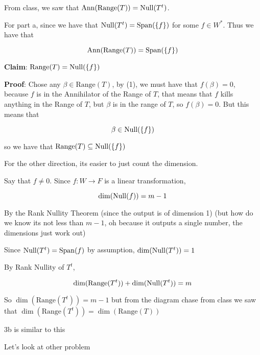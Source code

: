 \documentclass[12pt]{article}
\def\range{\text{Range}}
\def\Ann{\text{Ann}}
\begin{document}
{\begin{center}
    \end{center}

    From class, we saw that $\Ann(\range(T)) = \Null(T^t)$.

    For part a, since we have that $\mathrm{Null}(T^t) = \mathrm{Span}(\{f\})$ for some $f \in
    W^*$. Thus we have that

    \begin{equation}
      \Ann(\range(T)) = \Span(\{f\})
    \end{equation}

    {\bf Claim}: $\range(T) = \Null(\{f\})$

    {\bf Proof}: Chose any $\beta \in \range(T)$, by (1), we must have that
    $f(\beta) = 0$, because $f$ is in the Annihilator of the Range of $T$, that
    means that $f$ kills anything in the Range of $T$, but $\beta$ is in the
    range of $T$, so $f(\beta) = 0$. But this means that

    \[
      \beta \in \mathrm{Null}(\{f\})
    \]

    so we have that $\range(T) \subseteq \Null(\{f\})$

    For the other direction, its easier to just count the dimension.

    Say that $f \ne 0$. Since $f: W \to F$ is a linear transformation, 

    \[
      \dim(\mathrm{Null}(f)) = m - 1
    \]

    By the Rank Nullity Theorem (since the output is of dimension 1) (but how do
    we know its not less than $m - 1$, oh because it outputs a single number,
    the dimensions just work out)

    Since $\mathrm{Null}(T^t) = \mathrm{Span}(f)$ by assumption, $\dim(\mathrm{Null}(T^t)) = 1$

    By Rank Nullity of $T^t$,

    \[
      \dim(\range(T^t)) + \dim(\Null(T^t)) = m
    \]

    So $\dim(\range(T^t)) = m - 1$ but from the diagram chase from class we saw
    that $\dim(\range(T^t)) = \dim(\range(T))$

    3b is similar to this
  }

  Let's look at other problem
\end{document}
